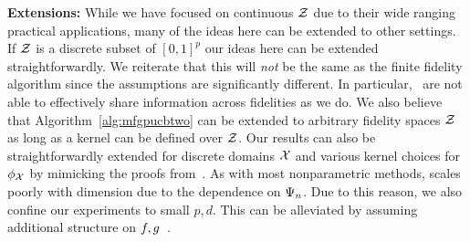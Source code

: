 \textbf{Extensions:}
While we have focused on continuous $\mathcal{Z}$ due to their wide ranging
practical applications, many of the ideas here can be extended to other settings.
If $\mathcal{Z}$ is a discrete subset of $[0,1]^p$ our ideas here can be extended
straightforwardly.
We reiterate that this will \emph{not} be the same as the finite fidelity
\mfgpucbones algorithm  since the assumptions are significantly different.
In particular,~\citet{kandasamy16mfbo} are not able to effectively share
information across fidelities as we do.
We also believe that Algorithm~\ref{alg:mfgpucbtwo} can be extended to arbitrary fidelity
spaces $\mathcal{Z}$ as long as a kernel can be defined over $\mathcal{Z}$.
Our results can also be straightforwardly extended for discrete domains $\mathcal{X}$
and various kernel choices for $\phi_{\mathcal{X}}$ by mimicking the proofs
from~\citet{srinivas10gpbandits}.
As with most nonparametric methods, \mfgpucbtwos scales poorly with
dimension due to the dependence on $\Psi_{n}$.
Due to this reason, we also confine our experiments to small $p,d$.
This can be alleviated by assuming additional structure on
$f,g$~\citep{djolonga13highdimbandits,kandasamy15addBO}.


